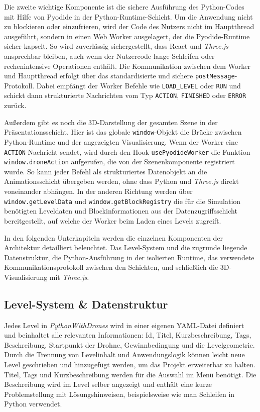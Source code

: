 \documentclass[a4paper,12pt]{article}
\begin{document}
	Die zweite wichtige Komponente ist die sichere Ausführung des Python-Codes mit Hilfe 
	von Pyodide in der Python-Runtime-Schicht. Um die Anwendung nicht zu blockieren oder 
	einzufrieren, wird der Code des Nutzers nicht im Hauptthread ausgeführt, sondern in einen 
	Web Worker ausgelagert, der die Pyodide-Runtime sicher kapselt. So wird zuverlässig 
	sichergestellt, dass React und \textit{Three.js} ansprechbar bleiben, auch wenn der 
	Nutzercode lange Schleifen oder rechenintensive Operationen enthält. Die Kommunikation 
	zwischen dem Worker und Hauptthread erfolgt über das standardisierte und sichere 
	\texttt{postMessage}-Protokoll. Dabei empfängt der Worker Befehle wie \texttt{LOAD\_LEVEL} 
	oder \texttt{RUN} und schickt dann strukturierte Nachrichten vom Typ \texttt{ACTION}, 
	\texttt{FINISHED} oder \texttt{ERROR} zurück.

	Außerdem gibt es noch die 3D-Darstellung der gesamten Szene in der Präsentationsschicht. 
	Hier ist das globale \texttt{window}-Objekt die Brücke zwischen Python-Runtime und der 
	angezeigten Visualisierung. Wenn der Worker eine \texttt{ACTION}-Nachricht sendet, wird 
	durch den Hook \texttt{usePyodideWorker} die Funktion \texttt{window.droneAction} aufgerufen, 
	die von der Szenenkomponente registriert wurde. \newpage So kann jeder Befehl als strukturiertes 
	Datenobjekt an die Animationsschicht übergeben werden, ohne dass Python und \textit{Three.js} 
	direkt voneinander abhängen. In der anderen Richtung werden über \texttt{window.getLevelData} 
	und \texttt{window.getBlockRegistry} die für die Simulation benötigten Leveldaten und 
	Blockinformationen aus der Datenzugriffsschicht bereitgestellt, auf welche der Worker
	beim Laden eines Levels zugreift.

	In den folgenden Unterkapiteln werden die einzelnen Komponenten der Architektur 
	detailliert beleuchtet. Das Level-System und die zugrunde liegende Datenstruktur, 
	die Python-Ausführung in der isolierten Runtime, das verwendete Kommunikationsprotokoll 
	zwischen den Schichten, und schließlich die 3D-Visualisierung mit \textit{Three.js}.

	\subsection{Level-System \& Datenstruktur}
	Jedes Level in \textit{PythonWithDrones} wird in einer eigenen YAML-Datei 
	definiert und beinhaltet alle relevanten Informationen: Id, Titel, 
	Kurzbeschreibung, Tags, Beschreibung, Startpunkt der Drohne, Gewinnbedingung 
	und die Levelgeometrie. Durch die Trennung von Levelinhalt und Anwendungslogik 
	können leicht neue Level geschrieben und hinzugefügt werden, um das 
	Projekt erweiterbar zu halten. Titel, Tags und Kurzbeschreibung werden für 
	die Auswahl im Menü benötigt. Die Beschreibung wird im Level selber 
	angezeigt und enthält eine kurze Problemstellung mit Lösungshinweisen, 
	beispielsweise wie man Schleifen in Python verwendet.
\end{document}
